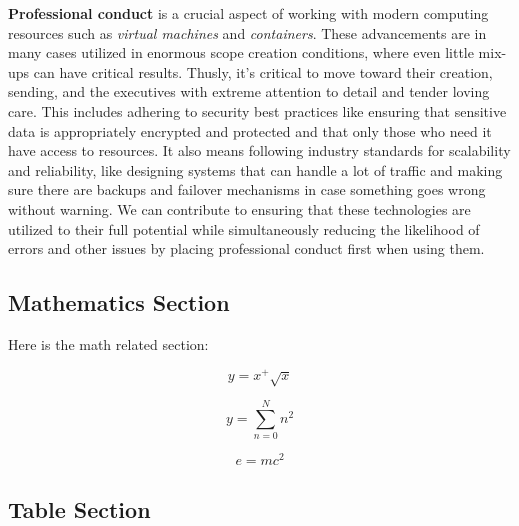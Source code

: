 \documentclass{article}
\begin{document}
\textbf{Professional conduct} is a crucial aspect of working with modern computing resources such as \emph{virtual machines} and \emph{containers}.  These advancements are in many cases utilized in enormous scope creation conditions, where even little mix-ups can have critical results. Thusly, it's critical to move toward their creation, sending, and the executives with extreme attention to detail and tender loving care. This includes adhering to security best practices like ensuring that sensitive data is appropriately encrypted and protected and that only those who need it have access to resources. It also means following industry standards for scalability and reliability, like designing systems that can handle a lot of traffic and making sure there are backups and failover mechanisms in case something goes wrong without warning. We can contribute to ensuring that these technologies are utilized to their full potential while simultaneously reducing the likelihood of errors and other issues by placing professional conduct first when using them.



\subsection{Mathematics Section}

Here is the math related section:



\begin{equation}

y=x^+\sqrt{x}

\end{equation}



\begin{equation}

y=\sum_{n=0}^N n^2

\end{equation}



\begin{equation}

e=mc^2

\end{equation}





\subsection{Table Section}
\end{document}

